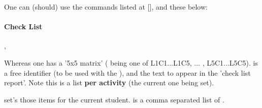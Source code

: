 \documentclass[article,nogeometry,english,tocdepth=3,secdepth=3]{ufrgscca} %
\begin{document}
One can (should) use the commands listed at [], and these below:

\paragraph{Check List}
\begin{codedescribe}[code,update=2023/11/18]{\checkdef,\checklist}%
\begin{codesyntax}%
\end{codesyntax}
Whereas one has a '5x5 matrix' ( being one of L1C1...L1C5, ... , L5C1...L5C5).  is a free identifier (to be used with the \tsmacro{\checklist}{}), and  the text to appear in the 'check list report'.  Note this is a list \textbf{per activity} (the current one being set).

\tsmacro{\checklist}{} set's those items for the current student.  is a comma separated list of .

\begin{codestore}[st=d.check]


\end{codestore}



\end{codedescribe}\\
\end{document}
